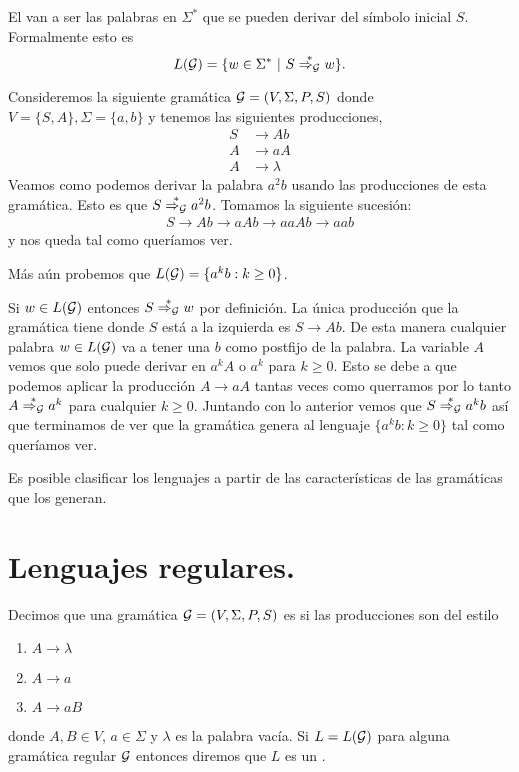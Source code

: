 \documentclass[tesis.tex]{subfiles}
\newcommand{\gramatica}{{\cal G} = (V, \Sigma, P, S)}
\newcommand{\deriva}{\overset{*}{\Rightarrow_{\cal G}}}
\newcommand{\lengderivado}{L({\cal G})}
\begin{document}
\medskip
\begin{deff}
	El  van a ser las palabras en $\Sigma^*$ que se pueden derivar del símbolo inicial $S$. Formalmente esto es
	\[
	L({\cal G}) = \{ w \in \Sigma^* \ | \ S \overset{*}{\Rightarrow_{\cal G}} w   \}.
	\]
\end{deff}
\medskip
\begin{ej}\label{gramatica-regular}
	Consideremos la siguiente gramática ${\cal G} = (V, \Sigma, P, S)$ donde $V = \{ S, A \}, \Sigma = \{ a,b \}$ y tenemos las siguientes producciones,
	\begin{align*}
	S & \to Ab \\
	A & \to aA \\
	A & \to \lambda
	\end{align*}
	Veamos como podemos derivar la palabra $a^2b$ usando las producciones de esta gramática. 
	Esto es que $S \deriva a^2b$.
	Tomamos la siguiente sucesión:
	\begin{align*}
		S \to Ab \to aAb \to aaAb \to aab
	\end{align*} 
	y nos queda tal como queríamos ver.
	
	Más aún probemos que $L({\cal G}) = \{ a^{k}b : k \ge 0 \}$. 
	
	Si $w \in L(\cal G)$ entonces $S \deriva w$ por definición. 
	La única producción que la gramática tiene donde $S$ está a la izquierda es $S \to Ab$. 
	De esta manera cualquier palabra $w \in L(\cal G)$ va a tener una $b$ como postfijo de la palabra. 
	La variable $A$ vemos que solo puede derivar en $a^{k}A$ o $a^{k}$ para $k \ge 0$.
	Esto se debe a que podemos aplicar la producción $A \to aA$ tantas veces como querramos por lo tanto $A \deriva a^k$ para cualquier $k \ge 0$.
	Juntando con lo anterior vemos que $S \deriva a^{k}b$ así que terminamos de ver que la gramática genera al lenguaje $\{a^kb : k \ge 0\}$ tal como queríamos ver.
\end{ej}



Es posible clasificar los lenguajes a partir de las características de las gramáticas que los generan. 

\section{Lenguajes regulares.}

\begin{deff}
	Decimos que una gramática $\gramatica$ es  si las producciones son del estilo
	\begin{enumerate}
		\item $A \to \lambda$
		\item $A \to a$
		\item $A \to a B$
	\end{enumerate}
	donde $A, B \in V$, $a \in \Sigma$ y $\lambda$ es la palabra vacía. 
	Si $L=\lengderivado$ para alguna gramática regular $\cal G$ entonces diremos que $L$ es un . 
\end{deff}
\end{document}
